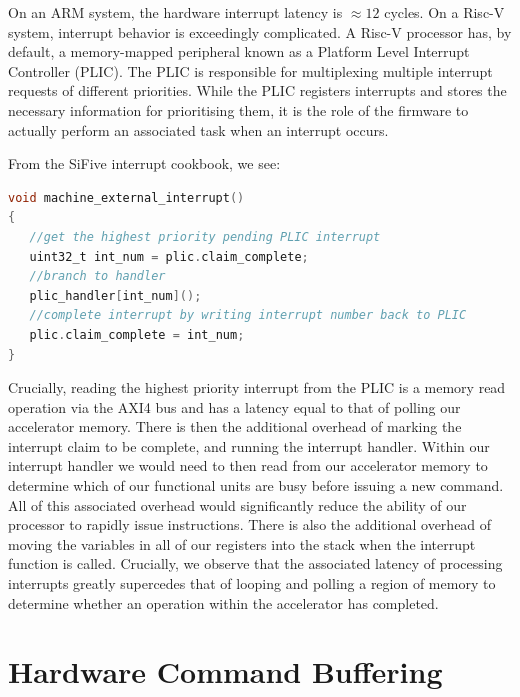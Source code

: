 \documentclass[a4paper,8pt]{report}
\begin{document}
On an ARM system, the hardware interrupt latency is $\approx 12$ cycles. On a
Risc-V system, interrupt behavior is exceedingly complicated. A Risc-V processor
has, by default, a memory-mapped peripheral known as a Platform Level Interrupt
Controller (PLIC). The PLIC is responsible for multiplexing multiple interrupt
requests of different priorities. While the PLIC registers interrupts and stores
the necessary information for prioritising them, it is the role of the firmware
to actually perform an associated task when an interrupt occurs.


From the SiFive interrupt cookbook, we see:
\begin{lstlisting}[language=C,style=customc]
void machine_external_interrupt()
{
   //get the highest priority pending PLIC interrupt
   uint32_t int_num = plic.claim_complete;
   //branch to handler
   plic_handler[int_num]();
   //complete interrupt by writing interrupt number back to PLIC
   plic.claim_complete = int_num;
}
\end{lstlisting}

Crucially, reading the highest priority interrupt from the PLIC is a memory
read operation via the AXI4 bus and has a latency equal to that of polling our
accelerator memory. There is then the additional overhead of marking the
interrupt claim to be complete, and running the interrupt handler. Within our
interrupt handler we would need to then read from our accelerator memory to
determine which of our functional units are busy before issuing a new command.
All of this associated overhead would significantly reduce the ability of our
processor to rapidly issue instructions. There is also the additional overhead
of moving the variables in all of our registers into the stack when the
interrupt function is called. Crucially, we observe that the associated latency
of processing interrupts greatly supercedes that of looping and polling a region
of memory to determine whether an operation within the accelerator has completed.

\section{Hardware Command Buffering}
                                                                                                                                                              
\end{document}
